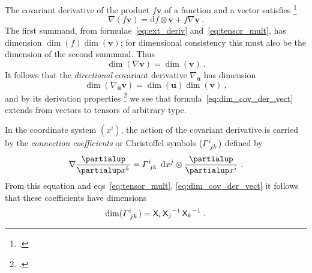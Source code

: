 \documentclass[\ifafour a4paper,12pt,\else a5paper,10pt,\fi%
onecolumn,oneside,article,%
british%
]{memoir}
\theoremstyle{remark}
\theoremstyle{innote}
\newcommand*{\citep}{\footcites}
\newcommand*{\de}{\partialup}%
\newcommand*{\di}{\mathrm{d}}%
\renewcommand*{\|}[1][]{\nonscript\,#1\vert\nonscript\;\mathopen{}}
\newcommand*{\sect}{\S}%
\newcommand*{\eqns}{eqs}%
\newcommand*{\Xx}{\textsf{X}}
\newcommand*{\yv}{\bm{v}}
\newcommand*{\yu}{\bm{u}}
\renewcommand*{\i}{\indices}
\newcommand*{\dex}[1][i]{\frac{\de}{\de x^{#1}}}
\newcommand*{\dix}[1][i]{\di x^{#1}}
\newcommand*{\nab}{\nabla}
\newcommand*{\yGa}{\varGamma}
\begin{document}
The covariant derivative of the product $f\yv$ of a function and a vector
satisfies \citep[\sect~V.B.1]{choquetbruhatetal1977_r1996}
\begin{equation}
  \label{eq:basic_property_covder}
  \nab(f\yv) = \di f \otimes \yv + f\nab\yv\ .
\end{equation}
The first summand, from formulae~\eqref{eq:ext_deriv}
and~\eqref{eq:tensor_mult}, has dimension $\dim(f)\dim(\yv)$; for
dimensional consistency this must also be the dimension of the second
summand. Thus
\begin{equation}
  \label{eq:dim_cov_der_vect}
  \dim(\nab\yv) = \dim(\yv)\ .
\end{equation}
It follows that the \emph{directional} covariant derivative $\nab_{\yu}$
has dimension
\begin{equation}
  \label{eq:dim_dircov_der_vect}
  \dim(\nab_{\yu}\yv) = \dim(\yu)\dim(\yv)\ ,
\end{equation}
and by its derivation properties \citep[\sect~V.B.1
p.~303]{choquetbruhatetal1977_r1996} we see that
formula~\eqref{eq:dim_cov_der_vect} extends from vectors to 
tensors of arbitrary type.

\medskip

In the coordinate system $(x^{i})$, the action of the covariant derivative
is carried by the \emph{connection coefficients} or Christoffel symbols
$(\yGa\i{^{i}_{jk}})$ defined by
\begin{equation}
  \label{eq:christoffel}
  \nab\dex[k] = \yGa\i{^{i}_{jk}}\  \dix[j]\otimes\dex[i]\ .
\end{equation}
From this equation and \eqns~\eqref{eq:tensor_mult},
\eqref{eq:dim_cov_der_vect} it follows that these coefficients have
dimensions
\begin{equation}
  \label{eq:dim_christoffel}
  \dim(\yGa\i{^{i}_{jk}}) = \Xx_{i}\, {\Xx_{j}}^{-1}\,{\Xx_{k}}^{-1}\ .
\end{equation}

\medskip
\end{document}
